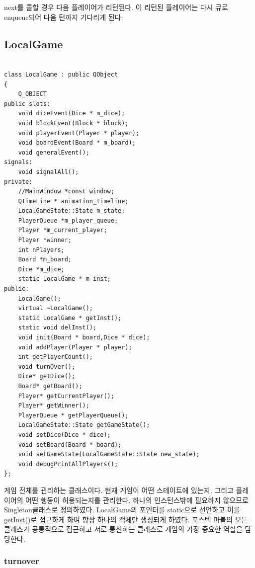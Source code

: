 \documentclass[10pt,oneside,a4paper,titlepage]{article}
\begin{document}
next를 콜할 경우 다음 플레이어가 리턴된다. 이 리턴된 플레이어는 다시 큐로 enqueue되어 다음 턴까지 기다리게 된다. 

\subsection{LocalGame}

\begin{lstlisting}[frame=single,caption=
{LocalGame header},label=code:FD,captionpos=b,framexleftmargin=10pt]

class LocalGame : public QObject
{
    Q_OBJECT
public slots:
    void diceEvent(Dice * m_dice);
    void blockEvent(Block * block);
    void playerEvent(Player * player);
    void boardEvent(Board * m_board);
    void generalEvent();
signals:
    void signalAll();
private:
    //MainWindow *const window;
    QTimeLine * animation_timeline;
    LocalGameState::State m_state;
    PlayerQueue *m_player_queue;
    Player *m_current_player;
    Player *winner;
    int nPlayers;
    Board *m_board;
    Dice *m_dice;
    static LocalGame * m_inst;
public:
    LocalGame();
    virtual ~LocalGame();
    static LocalGame * getInst();
    static void delInst();
    void init(Board * board,Dice * dice);
    void addPlayer(Player * player);
    int getPlayerCount();
    void turnOver();
    Dice* getDice();
    Board* getBoard();
    Player* getCurrentPlayer();
    Player* getWinner();
    PlayerQueue * getPlayerQueue();
    LocalGameState::State getGameState();
    void setDice(Dice * dice);
    void setBoard(Board * board);
    void setGameState(LocalGameState::State new_state);
    void debugPrintAllPlayers();
};
\end{lstlisting}

게임 전체를 괸리하는 클래스이다. 현재 게임이 어떤 스테이트에 있는지, 그리고 플레이어의 어떤 행동이 허용되는지를 관리한다. 하나의 인스턴스밖에 필요하지 않으므로 Singleton클래스로 정의하였다. LocalGame의 포인터를 static으로 선언하고 이를 getInst()로 접근하게 하여 항상 하나의 객체만 생성되게 하였다. 포스텍 마블의 모든 클래스가 공통적으로 접근하고 서로 통신하는 클래스로 게임의 가장 중요한 역할을 담당한다. 

\subsubsection{turnover}
\end{document}
